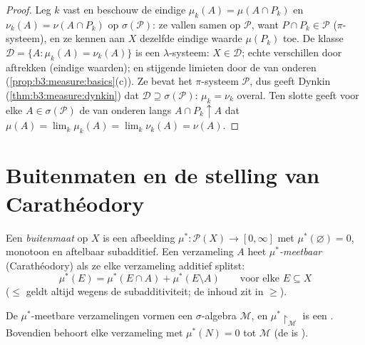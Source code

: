 \begin{proof}
Leg $k$ vast en beschouw de eindige  $\mu_k(A) = \mu(A \cap
P_k)$ en $\nu_k(A) = \nu(A \cap P_k)$ op $\sigma(\mathcal P)$: ze
vallen samen op $\mathcal P$, want $P \cap P_k \in \mathcal P$
($\pi$-systeem), en ze kennen aan $X$ dezelfde eindige waarde
$\mu(P_k)$ toe. De klasse $\mathcal D = \{A : \mu_k(A) =
\nu_k(A)\}$ is een $\lambda$-systeem: $X \in \mathcal D$; echte
verschillen door aftrekken (eindige waarden); en stijgende
limieten door de  van onderen
(\cref{prop:b3:measure:basics}(c)). Ze bevat het $\pi$-systeem
$\mathcal P$, dus geeft Dynkin (\cref{thm:b3:measure:dynkin}) dat
$\mathcal D \supseteq \sigma(\mathcal P)$: $\mu_k = \nu_k$ overal.
Ten slotte geeft voor elke $A \in \sigma(\mathcal P)$ de
 van onderen langs $A \cap P_k \uparrow A$ dat $\mu(A)
= \lim_k\mu_k(A) = \lim_k\nu_k(A) = \nu(A)$.
\end{proof}

\section{Buitenmaten en de stelling van Carathéodory}

\begin{definition}\label{def:b3:measure:outer}
Een \emph{buitenmaat} op $X$ is een afbeelding
$\mu^* \colon \mathcal P(X) \to [0, \infty]$ met
$\mu^*(\varnothing) = 0$, monotoon en aftelbaar subadditief. Een
verzameling $A$ heet \emph{$\mu^*$-meetbaar} (Carathéodory) als ze
elke verzameling additief splitst:
\[
\mu^*(E) = \mu^*(E \cap A) + \mu^*(E \setminus A)
\qquad \text{voor elke } E \subseteq X
\]
($\leq$ geldt altijd wegens de subadditiviteit; de inhoud zit in
$\geq$).
\end{definition}

\begin{theorem}[Carathéodory]\label{thm:b3:measure:caratheodory}
De $\mu^*$-meetbare verzamelingen vormen een $\sigma$-algebra
$\mathcal M$, en $\mu^*\restriction_{\mathcal M}$ is een .
Bovendien behoort elke verzameling met $\mu^*(N) = 0$ tot
$\mathcal M$ (de  is \emph{}).
\end{theorem}

